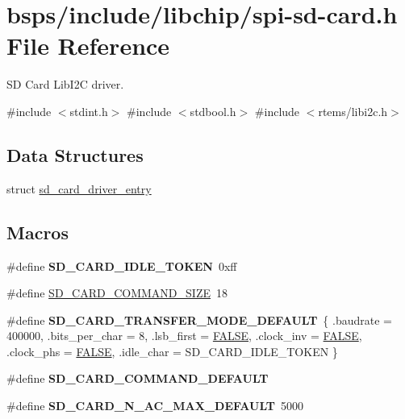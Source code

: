 \hypertarget{spi-sd-card_8h}{}\section{bsps/include/libchip/spi-\/sd-\/card.h File Reference}
\label{spi-sd-card_8h}


SD Card Lib\+I2C driver.  


{\ttfamily \#include $<$stdint.\+h$>$}\newline
{\ttfamily \#include $<$stdbool.\+h$>$}\newline
{\ttfamily \#include $<$rtems/libi2c.\+h$>$}\newline
\subsection*{Data Structures}
\begin{DoxyCompactItemize}
\item 
struct \mbox{\hyperlink{structsd__card__driver__entry}{sd\+\_\+card\+\_\+driver\+\_\+entry}}
\end{DoxyCompactItemize}
\subsection*{Macros}
\begin{DoxyCompactItemize}
\item 
\mbox{\label{spi-sd-card_8h_a94e2baceedbdd59f7df7a6a5db46b2cf}} 
\#define {\bfseries S\+D\+\_\+\+C\+A\+R\+D\+\_\+\+I\+D\+L\+E\+\_\+\+T\+O\+K\+EN}~0xff
\item 
\#define \mbox{\hyperlink{spi-sd-card_8h_add81282988892598d653b96979fb8991}{S\+D\+\_\+\+C\+A\+R\+D\+\_\+\+C\+O\+M\+M\+A\+N\+D\+\_\+\+S\+I\+ZE}}~18
\item 
\mbox{\label{spi-sd-card_8h_a19874281230a71d3b6d399ff014f2b90}} 
\#define {\bfseries S\+D\+\_\+\+C\+A\+R\+D\+\_\+\+T\+R\+A\+N\+S\+F\+E\+R\+\_\+\+M\+O\+D\+E\+\_\+\+D\+E\+F\+A\+U\+LT}~\{ .baudrate = 400000, .bits\+\_\+per\+\_\+char = 8, .lsb\+\_\+first = \mbox{\hyperlink{group__RTEMSScoreBaseDefs_gaa93f0eb578d23995850d61f7d61c55c1}{F\+A\+L\+SE}}, .clock\+\_\+inv = \mbox{\hyperlink{group__RTEMSScoreBaseDefs_gaa93f0eb578d23995850d61f7d61c55c1}{F\+A\+L\+SE}}, .clock\+\_\+phs = \mbox{\hyperlink{group__RTEMSScoreBaseDefs_gaa93f0eb578d23995850d61f7d61c55c1}{F\+A\+L\+SE}}, .idle\+\_\+char = S\+D\+\_\+\+C\+A\+R\+D\+\_\+\+I\+D\+L\+E\+\_\+\+T\+O\+K\+EN \}
\item 
\#define {\bfseries S\+D\+\_\+\+C\+A\+R\+D\+\_\+\+C\+O\+M\+M\+A\+N\+D\+\_\+\+D\+E\+F\+A\+U\+LT}
\item 
\mbox{\label{spi-sd-card_8h_a00c0a77333a51dc9718457086884e928}} 
\#define {\bfseries S\+D\+\_\+\+C\+A\+R\+D\+\_\+\+N\+\_\+\+A\+C\+\_\+\+M\+A\+X\+\_\+\+D\+E\+F\+A\+U\+LT}~5000
\end{DoxyCompactItemize}
